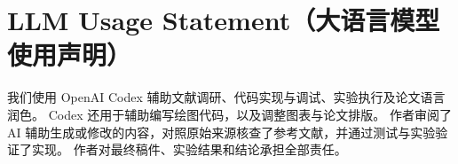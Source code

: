 \section*{LLM Usage Statement（大语言模型使用声明）}
\label{sec:llm_usage}
我们使用 OpenAI Codex 辅助文献调研、代码实现与调试、实验执行及论文语言润色。
Codex 还用于辅助编写绘图代码，以及调整图表与论文排版。
作者审阅了 AI 辅助生成或修改的内容，对照原始来源核查了参考文献，并通过测试与实验验证了实现。
作者对最终稿件、实验结果和结论承担全部责任。
